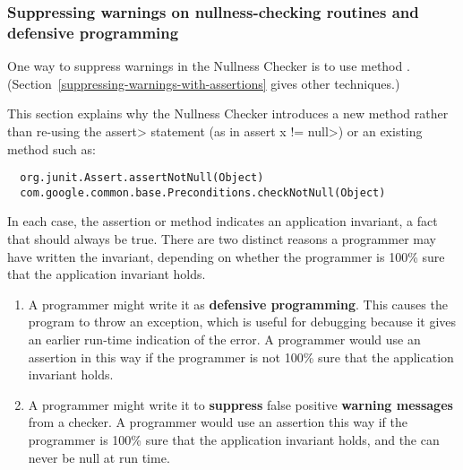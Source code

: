 \subsubsection{Suppressing warnings on nullness-checking routines and defensive programming\label{defensive-programming}}

% 


One way to suppress warnings in the Nullness Checker is to use
method .
(Section~\ref{suppressing-warnings-with-assertions} gives other techniques.)

This section explains why the Nullness Checker introduces a new method
rather than re-using the \<assert> statement (as in
\<assert x != null>) or an existing method such as:

\begin{Verbatim}
  org.junit.Assert.assertNotNull(Object)
  com.google.common.base.Preconditions.checkNotNull(Object)
\end{Verbatim}

In each case, the assertion or method indicates an application invariant, a
fact that should always be true.  There are two distinct reasons a
programmer may have written the invariant, depending on whether the
programmer is 100\% sure that the application invariant holds.

\begin{enumerate}
\item
  A programmer might write it as \textbf{defensive programming}.  This causes
  the program to throw an exception, which is useful for debugging because
  it gives an earlier run-time indication of the error.
  A programmer would use an assertion in this way if the programmer is not
  100\% sure that the application invariant holds.


\item
  A programmer might write it to \textbf{suppress} false positive
  \textbf{warning messages} from a checker.  A programmer would use an
  assertion this way if the programmer is 100\% sure that the application
  invariant holds, and the can never be null at run time.

\end{enumerate}

